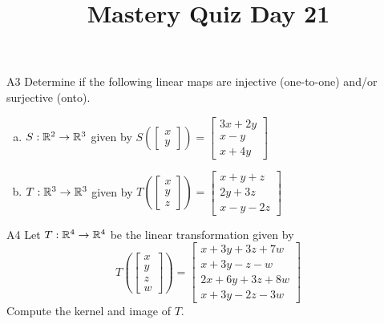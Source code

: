 \documentclass{sbgLAquiz}
\title{Mastery Quiz Day 21 }
\begin{document}
\begin{problem}{A3}
Determine if the following linear maps are injective (one-to-one) and/or surjective (onto).
\begin{enumerate}[(a)]
\item $S: \mathbb{R}^2 \rightarrow \mathbb{R}^3$ given by $S\left(\begin{bmatrix} x \\ y  \end{bmatrix} \right) = \begin{bmatrix} 3x+2y \\ x-y \\ x+4y \end{bmatrix} $
\item $T: \mathbb{R}^3 \rightarrow \mathbb{R}^3$ given by $T\left(\begin{bmatrix} x \\ y \\ z  \end{bmatrix} \right) = \begin{bmatrix} x+y+z \\ 2y+3z \\ x-y-2z \end{bmatrix} $
\end{enumerate}
\end{problem}

\begin{problem}{A4}
Let $T: \mathbb{R}^4\rightarrow \mathbb{R}^4$ be the linear transformation given by $$T\left(\begin{bmatrix} x \\ y \\ z \\ w \end{bmatrix} \right) = \begin{bmatrix} x+3y+3z+7w \\ x+3y-z-w \\ 2x+6y+3z+8w \\ x+3y-2z-3w \end{bmatrix}$$
Compute the kernel and image of $T$.
\end{problem}
\end{document}
